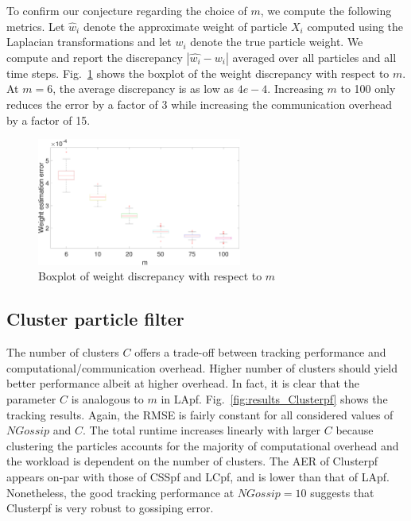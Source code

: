 \documentclass[10pt,letterpaper,final]{article}
\begin{document}
To confirm our conjecture regarding the choice of $m$, we compute the following metrics. Let $\hat{w}_i$ denote the approximate weight of particle $X_i$ computed using the Laplacian transformations and let $w_i$ denote the true particle weight. We compute and report the discrepancy $|\hat{w_i}-w_i|$ averaged over all particles and all time steps. Fig.~\ref{fig:boxplot_LApf_weight_discrepancy} shows the boxplot of the weight discrepancy with respect to $m$. At $m=6$, the average discrepancy is as low as $4e-4$. Increasing $m$ to 100 only reduces the error by a factor of 3 while increasing the communication overhead by a factor of 15.  

\begin{figure}
\centering
\includegraphics[width=0.6\textwidth]{Figures/boxplot_LApf_weight_discrepancy}
\caption{Boxplot of weight discrepancy with respect to $m$}
\label{fig:boxplot_LApf_weight_discrepancy}
\end{figure}

\subsection{Cluster particle filter}
The number of clusters $C$ offers a trade-off between tracking performance and computational/communication overhead. Higher number of clusters should yield better performance albeit at higher overhead. In fact, it is clear that the parameter $C$ is analogous to $m$ in LApf. Fig.~\ref{fig:results_Clusterpf} shows the tracking results. Again, the RMSE is fairly constant for all considered values of $NGossip$ and $C$. The total runtime increases linearly with larger $C$ because clustering the particles accounts for the majority of computational overhead and the workload is dependent on the number of clusters. The AER of Clusterpf appears on-par with those of CSSpf and LCpf, and is lower than that of LApf. Nonetheless, the good tracking performance at $NGossip=10$ suggests that Clusterpf is very robust to gossiping error. 
\end{document}
